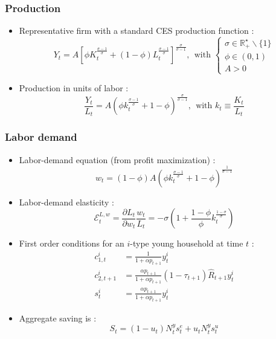 \documentclass{beamer}
\begin{document}
	\begin{frame}\frametitle{Production}
		\begin{itemize}
			\item Representative firm with a standard CES production function :
			\begin{equation*}
				Y_t = A\left[ \phi K_t^{\frac{\sigma - 1}{\sigma}} + (1-\phi) L_t^{\frac{\sigma - 1}{\sigma}}\right]^{\frac{\sigma}{\sigma-1}}, ~~ \text{with } \begin{cases}
				\sigma \in \mathbb{R}^\star_+ \smallsetminus\lbrace 1 \rbrace \\
				\phi \in (0,1) \\
				A > 0
				\end{cases} 
			\end{equation*}
			\item Production in units of labor :
			\begin{equation*}
				\frac{Y_t}{L_t} = A\left(\phi k_t^{\frac{\sigma-1}{\sigma}} + 1-\phi\right)^{\frac{\sigma}{\sigma-1}},~~ \text{with } k_t \equiv \frac{K_t}{L_t}
			\end{equation*}
		\end{itemize}
		\hyperlink{olgmodel<1>}{}
	\end{frame}
	\begin{frame}\frametitle{Labor demand}
		\begin{itemize}
			\item Labor-demand equation (from profit maximization) :
			\begin{equation*}
				w_t = (1-\phi)A\left(\phi k_t^{\frac{\sigma-1}{\sigma}}+1-\phi\right)^{\frac{1}{\sigma-1}}
			\end{equation*}
			\item Labor-demand elasticity :
			\begin{equation*}
				\mathcal{E}^{L,w}_t = \frac{\partial L_t}{\partial w_t}\frac{w_t}{L_t} = -\sigma\left(1+\frac{1-\phi}{\phi}k_t^{\frac{1-\sigma}{\sigma}}\right)
			\end{equation*}					
		\end{itemize}
		\hyperlink{olgmodel<1>}{}
	\end{frame}
		\begin{frame}[label = focutility]
			\begin{itemize}
				\item First order conditions for an $i$-type young household at time $t$ :
				\begin{align*}
				c^i_{1,t} &= \frac{1}{1+\alpha p_{t+1}} y^i_{t} \\
				c^i_{2,t+1} &= \frac{\alpha p_{t+1}}{1+\alpha p_{t+1}}(1-\tau_{t+1})\hat{R}_{t+1}y^i_{t} \\
				s^i_t &= \frac{\alpha p_{t+1}}{1+\alpha p_{t+1}} y^i_t
				\end{align*}
				\item Aggregate saving is :
				\begin{equation*}
					S_t = (1-u_t)N_t^ys_t^e + u_t N_t^y s_t^u
				\end{equation*}
			\end{itemize}
			\hyperlink{utilityresult<1>}{}
		\end{frame}
\end{document}
